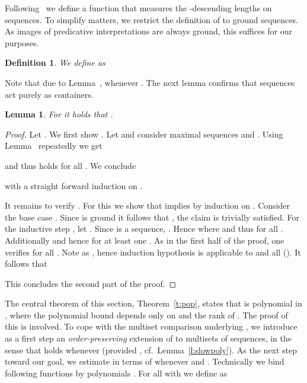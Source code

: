 \documentclass{LMCS}
\newtheorem{definition}[thm]{Definition}
\newtheorem{lemma}[thm]{Lemma}
\begin{document}
Following~\cite{AM05} we define a function  that measures the 
-descending lengths on sequences. To simplify matters, 
we restrict the definition of  to ground sequences.
As images of predicative interpretations are always ground, this suffices for our purposes.
\begin{definition}
We define 
as

\end{definition}

Note that due to Lemma~, 
whenever . The next lemma confirms that sequences act purely as containers.

\begin{lemma}\label{l:slowsum} 
  For  it holds that .
\end{lemma}
\begin{proof}
  Let .
  We first show .
  Let  and consider maximal sequences
   and
  .
  Using Lemma~ repeatedly we get
  
and thus 
   holds
  for all . We conclude
   
  with a straight forward induction on .

  It remains to verify .
  For this we show that  implies 
  by induction on .
  Consider the base case .
  Since  is ground it follows that , the claim is trivially satisfied.
  For the inductive step , 
  let .
  Since  is a sequence, .
  Hence  where  
  and thus  for all .
  Additionally  and hence  
  for at least one .
As in the first half of the proof, one verifies 
  for all .
  Note  as , 
  hence induction hypothesis is applicable to  and all  ().
  It follows that 
  
  This concludes the second part of the proof.
\end{proof}

The central theorem of this section, Theorem~\ref{t:pop}, states that 
is polynomial in , 
where the polynomial bound depends only on  and the rank  of .
The proof of this is involved.
To cope with the multiset comparison underlying ,
we introduce as a first step an \emph{order-preserving} 
extension  of  to multisets of sequences, 
in the sense that  holds 
whenever  
(provided , cf.~Lemma~\ref{l:slowpoly}).
As the next step toward our goal, we estimate  in terms 
of 
whenever  and .
Technically we bind following functions by polynomials . 
For all  with 
we define  as 
  
\end{document}
